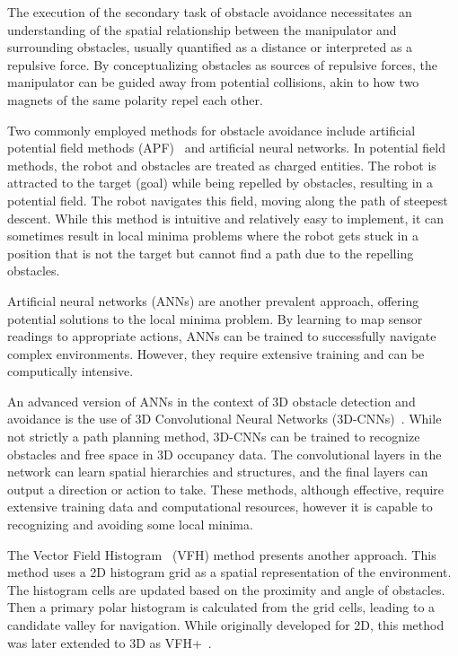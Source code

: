 \documentclass[a4paper]{article}
\begin{document}
The execution of the secondary task of obstacle avoidance necessitates an understanding of the spatial relationship between the manipulator and surrounding obstacles, usually quantified as a distance or interpreted as a repulsive force. By conceptualizing obstacles as sources of repulsive forces, the manipulator can be guided away from potential collisions, akin to how two magnets of the same polarity repel each other.

Two commonly employed methods for obstacle avoidance include artificial potential field methods (APF)~\cite{Khatib1985} and artificial neural networks. In potential field methods, the robot and obstacles are treated as charged entities. The robot is attracted to the target (goal) while being repelled by obstacles, resulting in a potential field. The robot navigates this field, moving along the path of steepest descent. While this method is intuitive and relatively easy to implement, it can sometimes result in local minima problems where the robot gets stuck in a position that is not the target but cannot find a path due to the repelling obstacles.

Artificial neural networks (ANNs) are another prevalent approach, offering potential solutions to the local minima problem. By learning to map sensor readings to appropriate actions, ANNs can be trained to successfully navigate complex environments. However, they require extensive training and can be computically intensive.

An advanced version of ANNs in the context of 3D obstacle detection and avoidance is the use of 3D Convolutional Neural Networks (3D-CNNs)~\cite{Duguleana2011}. While not strictly a path planning method, 3D-CNNs can be trained to recognize obstacles and free space in 3D occupancy data. The convolutional layers in the network can learn spatial hierarchies and structures, and the final layers can output a direction or action to take. These methods, although effective, require extensive training data and computational resources, however it is capable to recognizing and avoiding some local minima. 

The Vector Field Histogram~\cite{Borenstein1991} (VFH) method presents another approach. This method uses a 2D histogram grid as a spatial representation of the environment. The histogram cells are updated based on the proximity and angle of obstacles. Then a primary polar histogram is calculated from the grid cells, leading to a candidate valley for navigation. While originally developed for 2D, this method was later extended to 3D as VFH+~\cite{Ulrich1998}.
\end{document}
